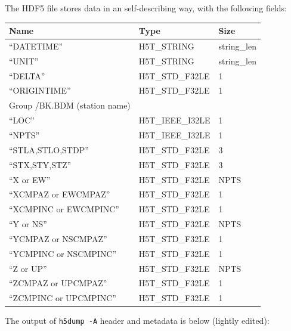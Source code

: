 \documentclass[11pt]{report}
\begin{document}
The HDF5 file stores data in an self-describing way, with the following fields:

\begin{center}
\begin{tabular}{lll}\hline
Name & Type & Size \\ \hline
  ``DATETIME'' & H5T\_STRING & string\_len \\ \hline
  ``UNIT'' & H5T\_STRING & string\_len \\ \hline
  ``DELTA'' & H5T\_STD\_F32LE & 1 \\ \hline
  ``ORIGINTIME'' & H5T\_STD\_F32LE & 1 \\ \hline
Group /BK.BDM (station name) \\ \hline
  ``LOC'' & H5T\_IEEE\_I32LE & 1  \\ \hline
  ``NPTS'' & H5T\_IEEE\_I32LE & 1  \\ \hline
  ``STLA,STLO,STDP'' & H5T\_STD\_F32LE & 3 \\ \hline
  ``STX,STY,STZ'' & H5T\_STD\_F32LE & 3 \\ \hline
  ``X or EW'' & H5T\_STD\_F32LE & NPTS \\ \hline
  ``XCMPAZ or EWCMPAZ'' & H5T\_STD\_F32LE & 1\\ \hline
  ``XCMPINC or EWCMPINC'' & H5T\_STD\_F32LE & 1\\ \hline
  ``Y or NS'' & H5T\_STD\_F32LE & NPTS \\ \hline
  ``YCMPAZ or NSCMPAZ'' & H5T\_STD\_F32LE & 1\\ \hline
  ``YCMPINC or NSCMPINC'' & H5T\_STD\_F32LE & 1\\ \hline
  ``Z or UP'' & H5T\_STD\_F32LE & NPTS \\ \hline
  ``ZCMPAZ or UPCMPAZ'' & H5T\_STD\_F32LE & 1\\ \hline
  ``ZCMPINC or UPCMPINC'' & H5T\_STD\_F32LE & 1\\ \hline
\end{tabular}
\end{center}

The output of {\tt h5dump -A} header and metadata is below (lightly edited):
\end{document}
